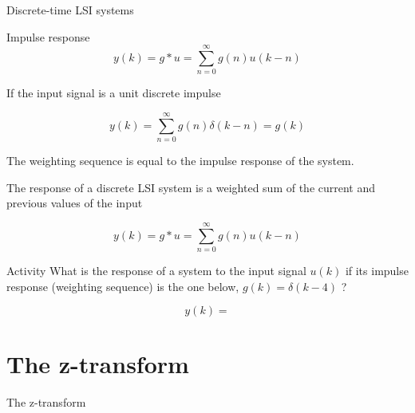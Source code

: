 \documentclass[presentation,aspectratio=169]{beamer}
\begin{document}
\begin{frame}[label={sec:org14c55ae}]{Discrete-time LSI systems}
\begin{block}{Impulse response}
\[ y(k) = g \ast u = \sum_{n=0}^\infty g(n) u(k-n) \]

If the input signal is a unit discrete impulse

\begin{center}
\end{center}


\pause

\[ y(k) = \sum_{n=0}^\infty g(n) \delta(k-n) = g(k) \]

\alert{The weighting sequence is equal to the impulse response of the system.}
\end{block}
\end{frame}

\begin{frame}[label={sec:org492926d}]{The response of a discrete LSI system is a weighted sum of the current and previous values of the input}
\small

\[ y(k) = g \ast u = \sum_{n=0}^\infty g(n) u(k-n) \]


\alert{Activity} What is the response of a system to the input signal \(u(k)\) if its impulse response (weighting sequence) is the one below, \(g(k) = \delta(k-4)\) ?

\begin{center}
\end{center}

\[y(k) = \]
\end{frame}
\section{The z-transform}
\label{sec:orgd453efc}
\begin{frame}[label={sec:org30fbcd1}]{The z-transform}
\end{frame}
\end{document}
